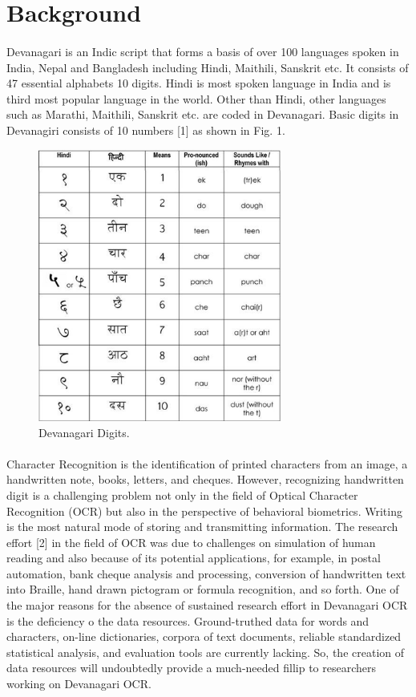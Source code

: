 \documentclass{article}
\begin{document}
\section{Background}
\paragraph{}
Devanagari is an Indic script that forms a basis of over 100 languages spoken in India, Nepal and Bangladesh including Hindi, Maithili, Sanskrit etc. It consists of 47 essential alphabets 10 digits. Hindi is most spoken language in India and is third most popular language in the world. Other than Hindi, other languages such as Marathi, Maithili, Sanskrit etc. are coded in Devanagari. Basic digits in Devanagiri consists of 10 numbers [1] as shown in Fig. 1.
\begin{figure}[ht]
	\centering
	\includegraphics[width=8cm]{figs/Picture1}
	\caption{Devanagari Digits.}
\end{figure}
\paragraph{}
Character Recognition is the identification of printed characters from an image, a handwritten note, books, letters, and cheques. However, recognizing handwritten digit is a challenging problem not only in the field of Optical Character Recognition (OCR) but also in the perspective of behavioral biometrics. Writing is the most natural mode of storing and transmitting information. The research effort [2] in the field of OCR was due to challenges on simulation of human reading and also because of its potential applications, for example, in postal automation, bank cheque analysis and processing, conversion of handwritten text into Braille, hand drawn pictogram or formula recognition, and so forth. One of the major reasons for the absence of sustained research effort in Devanagari OCR is the deficiency o the data resources. Ground-truthed data for words and characters, on-line dictionaries, corpora of text documents, reliable standardized statistical analysis, and evaluation tools are currently lacking. So, the creation of data resources will undoubtedly provide a much-needed fillip to researchers working on Devanagari OCR.
\end{document}
